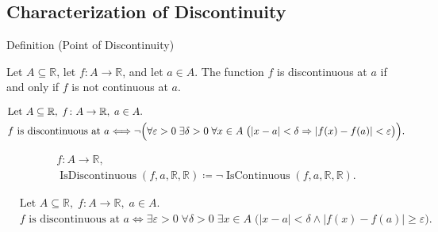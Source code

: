 
\subsection*{Characterization of Discontinuity}
\label{sec:discontinuity}

\begin{definitionbox}{Definition (Point of Discontinuity)}
\begin{definition}
\label{def:point-of-discontinuity}
Let $A \subseteq \mathbb{R}$, let $f \colon A \to \mathbb{R}$, and let $a \in A$. The function $f$ is discontinuous at $a$ if and only if $f$ is not continuous at $a$.
\end{definition}
\end{definitionbox}

\begin{remark*}
\[
\begin{aligned}
&\text{Let } A \subseteq \mathbb{R},\; f \colon A \to \mathbb{R},\; a \in A.\\
&f \text{ is discontinuous at } a
\Longleftrightarrow
\neg\Bigl(\forall \varepsilon > 0\; \exists \delta > 0\; \forall x \in A\;
\bigl(|x-a|<\delta \Rightarrow |f(x)-f(a)| < \varepsilon\bigr)\Bigr).
\end{aligned}
\]
\end{remark*}

\begin{remark*}
\[
\begin{aligned}
  f\colon A\to\mathbb{R},\\
\operatorname{IsDiscontinuous}(f,a,\mathbb{R},\mathbb{R}) \coloneqq \neg \operatorname{IsContinuous}(f,a,\mathbb{R},\mathbb{R}).
\end{aligned}
\]
\end{remark*}

\begin{remark*}
\[
\begin{aligned}
&\text{Let } A \subseteq \mathbb{R},\; f \colon A \to \mathbb{R},\; a \in A.\\
&f \text{ is discontinuous at } a
\Longleftrightarrow
\exists \varepsilon > 0\; \forall \delta > 0\; \exists x \in A\;
\bigl(|x-a|<\delta \land |f(x)-f(a)| \ge \varepsilon\bigr).
\end{aligned}
\]
\end{remark*}

